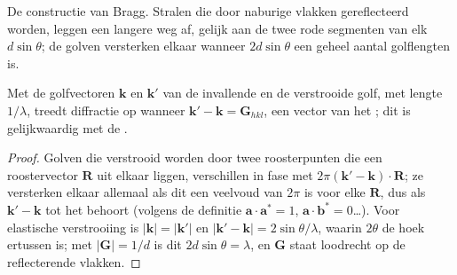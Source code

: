 \begin{omfigure}

{\small De constructie van Bragg. Stralen die door naburige vlakken
gereflecteerd worden, leggen een langere weg af, gelijk aan de twee rode
segmenten van elk $d\sin\theta$; de golven versterken elkaar wanneer
$2d\sin\theta$ een geheel aantal golflengten is.}
\end{omfigure}

\begin{proposition}\label{prop:b3:x-ray-diffraction:laue}
Met de golfvectoren $\mathbf k$ en $\mathbf k'$ van de invallende en de
verstrooide golf, met lengte
$1/\lambda$, treedt diffractie op wanneer $\mathbf k' - \mathbf k = \mathbf G_{hkl}$, een vector van het
; dit is gelijkwaardig met de .
\end{proposition}

\begin{proof}
Golven die verstrooid worden door twee roosterpunten die een roostervector
$\mathbf R$ uit elkaar liggen, verschillen in fase met $2\pi(\mathbf k' - \mathbf k)\cdot\mathbf R$; ze versterken
elkaar allemaal als dit een veelvoud van $2\pi$ is
voor elke $\mathbf R$, dus als $\mathbf k' - \mathbf k$ tot het  behoort (volgens de
definitie $\mathbf a\cdot\mathbf a^* = 1$, $\mathbf a\cdot\mathbf b^* = 0$\dots). Voor elastische verstrooiing is
$|\mathbf k| = |\mathbf k'|$ en $|\mathbf k' - \mathbf k| = 2\sin\theta/\lambda$, waarin $2\theta$ de hoek
ertussen is; met $|\mathbf G| = 1/d$ is dit $2d\sin\theta = \lambda$, en $\mathbf G$ staat loodrecht op
de reflecterende vlakken.
\end{proof}

